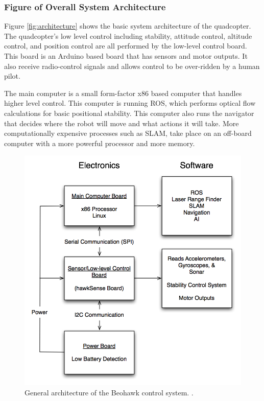 \documentclass[12pt, letterpaper]{article}
\begin{document}
\subsubsection{Figure of Overall System Architecture}

Figure \eqref{fig:architecture} shows the basic system architecture of the quadcopter. The quadcopter's low level control including stability, attitude control, altitude control, and position control are all performed by the low-level control board. This board is an Arduino based board that has sensors and motor outputs. It also receive radio-control signals and allows control to be over-ridden by a human pilot.

The main computer is a small form-factor x86 based computer that handles higher level control. This computer is running ROS, which performs optical flow calculations for basic positional stability. This computer also runs the navigator that decides where the robot will move and what actions it will take. More computationally expensive processes such as SLAM, take place on an off-board computer with a more powerful processor and more memory.

\begin{figure}[h]
\centering
\includegraphics[width=12cm]{images/Architecture-Diagram.png}
\caption{General architecture of the Beohawk control system. .} 
\label{fig:architecture}
\end{figure}
\end{document}
